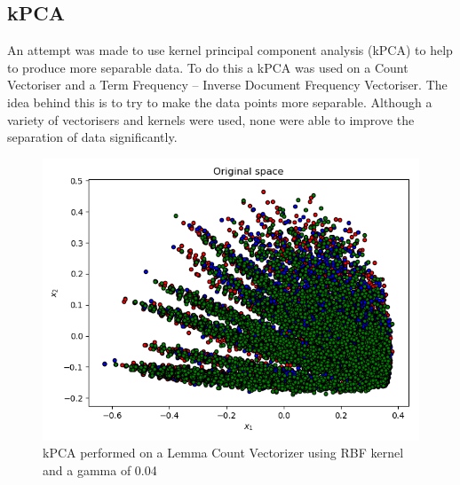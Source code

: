   \subsection{kPCA}
  \label{sec:kpca}
    An attempt was made to use kernel principal component analysis (kPCA) to help to produce more separable data. To do this a kPCA was used on a Count Vectoriser and a Term Frequency – Inverse Document Frequency Vectoriser. The idea behind this is to try to make the data points more separable. Although a variety of vectorisers and kernels were used, none were able to improve the separation of data significantly.
    
  \begin{figure}[h]
    \centering
    \includegraphics[width=\columnwidth]{Figures/Extensions/kPCALemmaRBF.png}
    \caption{kPCA performed on a Lemma Count Vectorizer using RBF kernel and a gamma of 0.04}
    \label{fig:balance}
  \end{figure}
  
